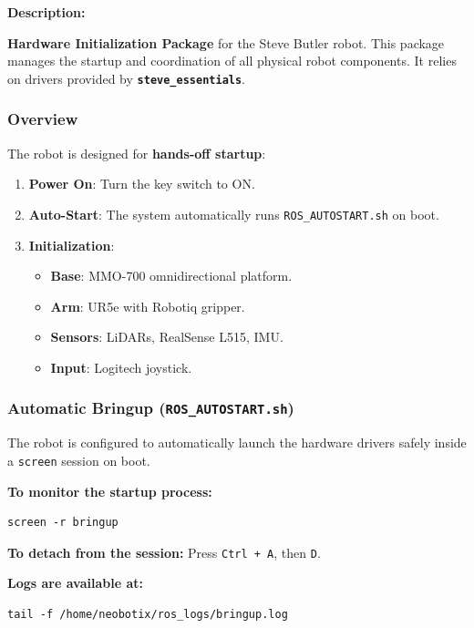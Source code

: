 \documentclass[12pt,oneside,a4paper]{article}
\begin{document}
\textbf{Description:}

\textbf{Hardware Initialization Package} for the Steve Butler robot. This package manages the startup and coordination of all physical robot components. It relies on drivers provided by \textbf{\texttt{steve\_essentials}}.

\subsubsection{Overview}

The robot is designed for \textbf{hands-off startup}:
\begin{enumerate}
    \item \textbf{Power On}: Turn the key switch to ON.
    \item \textbf{Auto-Start}: The system automatically runs \texttt{ROS\_AUTOSTART.sh} on boot.
    \item \textbf{Initialization}:
    \begin{itemize}
        \item \textbf{Base}: MMO-700 omnidirectional platform.
        \item \textbf{Arm}: UR5e with Robotiq gripper.
        \item \textbf{Sensors}: LiDARs, RealSense L515, IMU.
        \item \textbf{Input}: Logitech joystick.
    \end{itemize}
\end{enumerate}

\subsubsection{Automatic Bringup (\texttt{ROS\_AUTOSTART.sh})}

The robot is configured to automatically launch the hardware drivers safely inside a \texttt{screen} session on boot.

\textbf{To monitor the startup process:}
\begin{lstlisting}[style=bashstyle]
screen -r bringup
\end{lstlisting}

\textbf{To detach from the session:}
Press \texttt{Ctrl + A}, then \texttt{D}.

\textbf{Logs are available at:}
\begin{lstlisting}[style=bashstyle]
tail -f /home/neobotix/ros_logs/bringup.log
\end{lstlisting}
\end{document}
